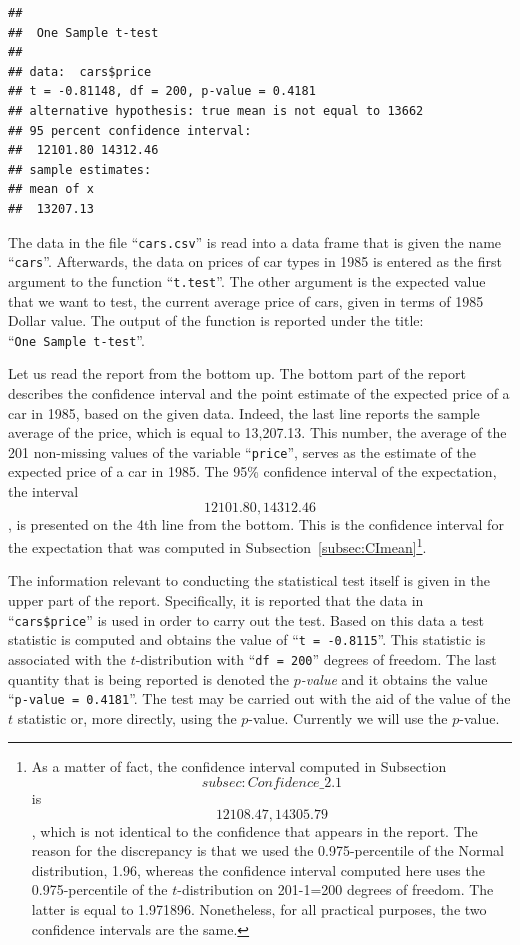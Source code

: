 \documentclass[
]{krantz}
\theoremstyle{definition}
\theoremstyle{definition}
\theoremstyle{definition}
\theoremstyle{remark}
\begin{document}
\begin{verbatim}
## 
##  One Sample t-test
## 
## data:  cars$price
## t = -0.81148, df = 200, p-value = 0.4181
## alternative hypothesis: true mean is not equal to 13662
## 95 percent confidence interval:
##  12101.80 14312.46
## sample estimates:
## mean of x 
##  13207.13
\end{verbatim}

The data in the file ``\texttt{cars.csv}'' is read into a data frame that is
given the name ``\texttt{cars}''. Afterwards, the data on prices of car types in
1985 is entered as the first argument to the function ``\texttt{t.test}''. The
other argument is the expected value that we want to test, the current
average price of cars, given in terms of 1985 Dollar value. The output
of the function is reported under the title: ``\texttt{One\ Sample\ t-test}''.

Let us read the report from the bottom up. The bottom part of the report
describes the confidence interval and the point estimate of the expected
price of a car in 1985, based on the given data. Indeed, the last line
reports the sample average of the price, which is equal to 13,207.13.
This number, the average of the 201 non-missing values of the variable
``\texttt{price}'', serves as the estimate of the expected price of a car in
1985. The 95\% confidence interval of the expectation, the interval
\[12101.80, 14312.46\], is presented on the 4th line from the bottom.
This is the confidence interval for the expectation that was computed in
Subsection~\ref{subsec:CImean}\footnote{As a matter of fact, the confidence interval computed in
  Subsection~\[subsec:Confidence\_2.1\] is \[12108.47, 14305.79\],
  which is not identical to the confidence that appears in the report.
  The reason for the discrepancy is that we used the 0.975-percentile
  of the Normal distribution, 1.96, whereas the confidence interval
  computed here uses the 0.975-percentile of the \(t\)-distribution on
  201-1=200 degrees of freedom. The latter is equal to 1.971896.
  Nonetheless, for all practical purposes, the two confidence
  intervals are the same.}.

The information relevant to conducting the statistical test itself is
given in the upper part of the report. Specifically, it is reported that
the data in ``\texttt{cars\$price}'' is used in order to carry out the test. Based
on this data a test statistic is computed and obtains the value of
``\texttt{t\ =\ -0.8115}''. This statistic is associated with the \(t\)-distribution
with ``\texttt{df\ =\ 200}'' degrees of freedom. The last quantity that is being
reported is denoted the \emph{\(p\)-value} and it obtains the value
``\texttt{p-value\ =\ 0.4181}''. The test may be carried out with the aid of the
value of the \(t\) statistic or, more directly, using the \(p\)-value.
Currently we will use the \(p\)-value.
\end{document}
